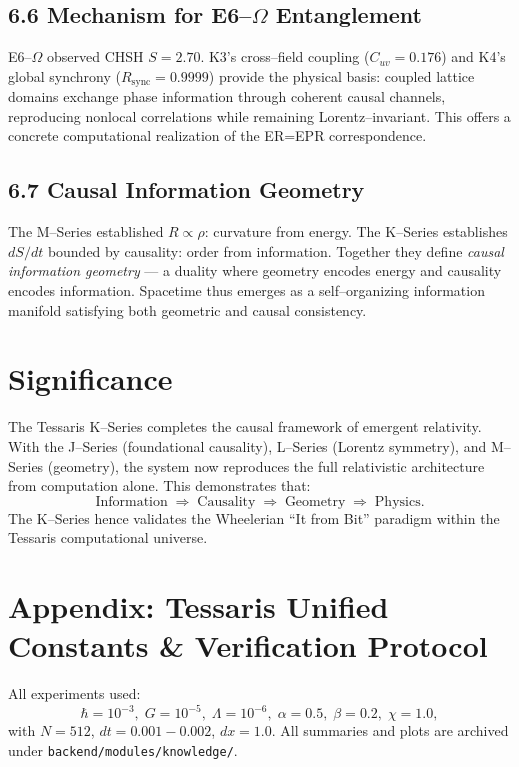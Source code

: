 \documentclass[11pt,a4paper]{article}
\begin{document}
\subsection*{6.6 Mechanism for E6--\(\Omega\) Entanglement}
E6--\(\Omega\) observed CHSH \(S=2.70\).  
K3's cross--field coupling (\(C_{uv}=0.176\)) and K4's global synchrony (\(R_{\mathrm{sync}}=0.9999\)) provide the physical basis:  
coupled lattice domains exchange phase information through coherent causal channels, reproducing nonlocal correlations while remaining Lorentz--invariant.  
This offers a concrete computational realization of the ER=EPR correspondence.

\subsection*{6.7 Causal Information Geometry}
The M--Series established \(R\propto\rho\): curvature from energy.  
The K--Series establishes \(dS/dt\) bounded by causality: order from information.  
Together they define \emph{causal information geometry} --- a duality where geometry encodes energy and causality encodes information.  
Spacetime thus emerges as a self--organizing information manifold satisfying both geometric and causal consistency.

\section{Significance}
The Tessaris K--Series completes the causal framework of emergent relativity.  
With the J--Series (foundational causality), L--Series (Lorentz symmetry), and M--Series (geometry), the system now reproduces the full relativistic architecture from computation alone.  
This demonstrates that:
\[
\text{Information} \;\Rightarrow\; \text{Causality} \;\Rightarrow\; \text{Geometry} \;\Rightarrow\; \text{Physics}.
\]
The K--Series hence validates the Wheelerian ``It from Bit'' paradigm within the Tessaris computational universe.

\section*{Appendix: Tessaris Unified Constants \& Verification Protocol}
All experiments used:
\[
\hbar{=}10^{-3},\;
G{=}10^{-5},\;
\Lambda{=}10^{-6},\;
\alpha{=}0.5,\;
\beta{=}0.2,\;
\chi{=}1.0,
\]
with \(N{=}512\), \(dt{=}0.001{-}0.002\), \(dx{=}1.0\).  
All summaries and plots are archived under \texttt{backend/modules/knowledge/}.
\end{document}
